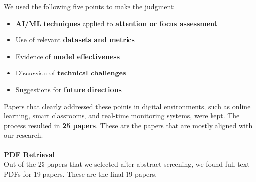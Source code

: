 \documentclass[12pt]{article}
\begin{document}
We used the following five points to make the judgment:
\begin{itemize}
    \item \textbf{AI/ML techniques} applied to \textbf{attention or focus assessment}
    \item Use of relevant \textbf{datasets and metrics}
    \item Evidence of \textbf{model effectiveness}
    \item Discussion of \textbf{technical challenges}
    \item Suggestions for \textbf{future directions}
\end{itemize}

Papers that clearly addressed these points in digital environments, such as online learning, smart classrooms, and real-time monitoring systems, were kept. The process resulted in \textbf{25 papers}. These are the papers that are mostly aligned with our research. \\ \\
\textbf{PDF Retrieval} \\ 
Out of the 25 papers that we selected after abstract screening, we found full-text PDFs for 19 papers. These are the final 19 papers.\\ \\
\end{document}
